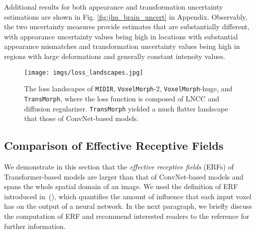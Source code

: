 \documentclass[times,twocolumn,final]{elsarticle}
\begin{document}
Additional results for both appearance and transformation uncertainty estimations are shown in Fig. \ref{fig:jhu_brain_uncert} in Appendix. Observably, the two uncertainty measures provide estimates that are substantially different, with appearance uncertainty values being high in locations with substantial appearance mismatches and transformation uncertainty values being high in regions with large deformations and generally constant intensity values.

\begin{figure*}[!h]
\centering
\texttt{[image: imgs/loss\_landscapes.jpg]}
\caption{The loss landscapes of \texttt{MIDIR}, \texttt{VoxelMorph}-2, \texttt{VoxelMorph}-huge, and \texttt{TransMorph}, where the loss function is composed of LNCC and diffusion regularizer. \texttt{TransMorph} yielded a much flatter landscape that those of ConvNet-based models. \label{fig:loss_landscape}}
\end{figure*}
\subsection{Comparison of Effective Receptive Fields}
\label{sec:comp_ERF}
We demonstrate in this section that the \textit{effective receptive fields} (ERFs) of Transformer-based models are larger than that of ConvNet-based models and spans the whole spatial domain of an image. We used the definition of ERF introduced in~(\cite{luo2016understanding}), which quantifies the amount of influence that each input voxel has on the output of a neural network. In the next paragraph, we briefly discuss the computation of ERF and recommend interested readers to the reference for further information.
\end{document}
